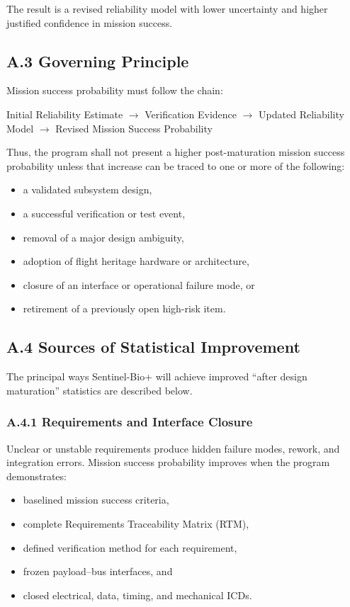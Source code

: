 \documentclass[11pt]{article}
\begin{document}
The result is a revised reliability model with lower uncertainty and higher justified confidence in
mission success.

\subsection*{A.3 Governing Principle}

Mission success probability must follow the chain:

\begin{center}
Initial Reliability Estimate $\rightarrow$ Verification Evidence $\rightarrow$ Updated Reliability Model
$\rightarrow$ Revised Mission Success Probability
\end{center}

Thus, the program shall not present a higher post-maturation mission success probability unless that
increase can be traced to one or more of the following:

\begin{itemize}
    \item a validated subsystem design,
    \item a successful verification or test event,
    \item removal of a major design ambiguity,
    \item adoption of flight heritage hardware or architecture,
    \item closure of an interface or operational failure mode, or
    \item retirement of a previously open high-risk item.
\end{itemize}

\subsection*{A.4 Sources of Statistical Improvement}

The principal ways Sentinel-Bio+ will achieve improved ``after design maturation'' statistics are
described below.

\subsubsection*{A.4.1 Requirements and Interface Closure}

Unclear or unstable requirements produce hidden failure modes, rework, and integration errors.
Mission success probability improves when the program demonstrates:

\begin{itemize}
    \item baselined mission success criteria,
    \item complete Requirements Traceability Matrix (RTM),
    \item defined verification method for each requirement,
    \item frozen payload--bus interfaces, and
    \item closed electrical, data, timing, and mechanical ICDs.
\end{itemize}
\end{document}
